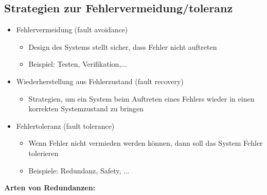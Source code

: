 \documentclass[a4paper,12pt,leqno]{article}
\begin{document}
\subsection{Strategien zur Fehlervermeidung/toleranz}
\begin{itemize}
\item Fehlervermeidung (fault avoidance)
	\begin{itemize}
	\item Design des Systems stellt sicher, dass Fehler nicht auftreten
	\item Beispiel: Testen, Verifikation,...
	\end{itemize}
\item Wiederherstellung aus Fehlerzustand (fault recovery)
	\begin{itemize}
	\item Strategien, um ein System beim Auftreten eines Fehlers wieder in einen korrekten Systemzustand zu bringen
	\end{itemize}
\item Fehlertoleranz (fault tolerance)
	\begin{itemize}
	\item Wenn Fehler nicht vermieden werden können, dann soll das System Fehler tolerieren
	\item Beispiele: Redundanz, Safety, ...
	\end{itemize}
\end{itemize}
\textbf{Arten von Redundanzen:}
\end{document}
